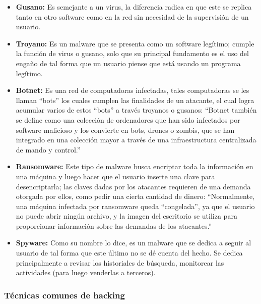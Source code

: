 \begin{itemize}
  \item \textbf{Gusano:}
    Es semejante a un virus, la diferencia radica en que este se replica tanto
    en otro software como en la red sin necesidad de la supervisión de un
    usuario. \parencite{Rosli2019}

  \item \textbf{Troyano:}
    Es un malware que se presenta como un software legítimo; cumple la función
    de virus o gusano, solo que su principal fundamento es el uso del engaño de
    tal forma que un usuario piense que está usando un programa legítimo.
    \parencite{Rosli2019}

  \item \textbf{Botnet:}
    Es una red de computadoras infectadas, tales computadoras se les llaman
    ``bots'' los cuales cumplen las finalidades de un atacante, el cual logra
    acumular varios de estos ``bots'' a través troyanos o gusanos: ``Botnet
    también se define como una colección de ordenadores que han sido infectados
    por software malicioso y los convierte en bots, drones o zombis, que se han
    integrado en una colección mayor a través de una infraestructura
    centralizada de mando y control.'' \parencite{Rosli2019}

  \item \textbf{Ransomware:}
    Este tipo de malware busca encriptar toda la información en una máquina y
    luego hacer que el usuario inserte una clave para desencriptarla; las claves
    dadas por los atacantes requieren de una demanda otorgada por ellos, como
    pedir una cierta cantidad de dinero: ``Normalmente, una máquina infectada
    por ransomware queda ``congelada'', ya que el usuario no puede abrir ningún
    archivo, y la imagen del escritorio se utiliza para proporcionar información
    sobre las demandas de los atacantes.'' \parencite{Rosli2019}

  \item \textbf{Spyware:}
    Como su nombre lo dice, es un malware que se dedica a seguir al usuario de
    tal forma que este último no se dé cuenta del hecho. Se dedica
    principalmente a revisar los historiales de búsqueda, monitorear las
    actividades (para luego venderlas a terceros).
    \parencite{Rosli2019}
\end{itemize}

\subsubsection{Técnicas comunes de hacking}


